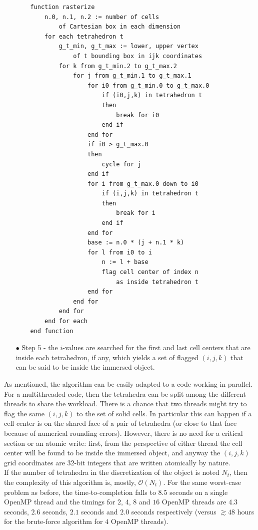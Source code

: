\begin{itemize}
\begin{verbatim}
    function rasterize
        n.0, n.1, n.2 := number of cells
            of Cartesian box in each dimension
        for each tetrahedron t
            g_t_min, g_t_max := lower, upper vertex
                of t bounding box in ijk coordinates
            for k from g_t_min.2 to g_t_max.2
                for j from g_t_min.1 to g_t_max.1
                    for i0 from g_t_min.0 to g_t_max.0
                        if (i0,j,k) in tetrahedron t
                        then
                            break for i0
                        end if
                    end for
                    if i0 > g_t_max.0
                    then
                        cycle for j
                    end if
                    for i from g_t_max.0 down to i0
                        if (i,j,k) in tetrahedron t
                        then
                            break for i
                        end if
                    end for
                    base := n.0 * (j + n.1 * k)
                    for l from i0 to i
                        n := l + base
                        flag cell center of index n
                            as inside tetrahedron t
                    end for
                end for
            end for
        end for each
    end function
\end{verbatim}

    \item[$\bullet$] Step 5 - the $i$-values are searched for the first and last cell centers that are inside each tetrahedron, if any, which yields a set of flagged $(i,j,k)$ that can be said to be inside the immersed object.
\end{itemize}

As mentioned, the algorithm can be easily adapted to a code working in parallel.
For a multithreaded code, then the tetrahedra can be split among the different threads to share the workload.
There is a chance that two threads might try to flag the same $(i,j,k)$ to the set of solid cells.
In particular this can happen if a cell center is on the shared face of a pair of tetrahedra (or close to that face because of numerical rounding errors).
However, there is no need for a critical section or an atomic write: first, from the perspective of either thread the cell center will be found to be inside the immersed object, and anyway the $(i,j,k)$ grid coordinates are $32$-bit integers that are written atomically by nature. \\
If the number of tetrahedra in the discretization of the object is noted $N_t$, then the complexity of this algorithm is, mostly, $\mathcal{O}(N_t)$.
For the same worst-case problem as before, the time-to-completion falls to $8.5$ seconds on a single OpenMP thread and the timings for $2$, $4$, $8$ and $16$ OpenMP threads are $4.3$ seconds, $2.6$ seconds, $2.1$ seconds and $2.0$ seconds respectively (versus $\gtrsim 48$ hours for the brute-force algorithm for $4$ OpenMP threads).

